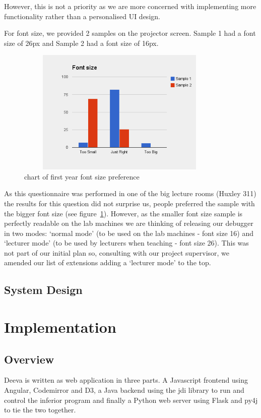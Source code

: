 \documentclass[11pt, a4paper]{article}
\begin{document}
However, this is not a priority as we are more concerned with implementing more functionality rather than a personalised UI design.

For font size, we provided 2 samples on the projector screen.
Sample 1 had a font size of 26px and Sample 2 had a font size of 16px.
\begin{figure}[h!]
\centering
\includegraphics[height=60mm,width=100mm]{fonts.png}
\caption{chart of first year font size preference}
\label{fig:label}
\end{figure}
As this questionnaire was performed in one of the big lecture rooms (Huxley 311) the results for this question did not surprise us, people preferred the sample with the bigger font size (see figure~\ref{fig:label}).
However, as the smaller font size sample is perfectly readable on the lab machines we are thinking of releasing our debugger in two modes: `normal mode' (to be used on the lab machines - font size 16) and  `lecturer mode' (to be used by lecturers when teaching - font size 26).
This was not part of our initial plan so, consulting with our project supervisor, we amended our list of extensions adding a `lecturer mode' to the top.

\subsection{System Design}

\section{Implementation}

\subsection{Overview}
Deeva is written as web application in three parts.
A Javascript frontend using Angular, Codemirror and D3, a Java backend using the jdi library to run and control the inferior program and finally a Python web server using Flask and py4j to tie the two together.
\end{document}
